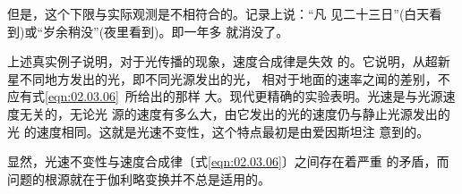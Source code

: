 但是，这个下限与实际观测是不相符合的。记录上说：“凡
见二十三日”(白天看到)或“岁余稍没”(夜里看到)。即一年多
就消没了。

上述真实例子说明，对于光传播的现象，速度合成律是失效
的。它说明，从超新星不同地方发出的光，即不同光源发出的光，
相对于地面的速率之闻的差别，不应有式\eqref{eqn:02.03.06}~所给出的那样
大。现代更精确的实验表明。光速是与光源速度无关的，无论光
源的速度有多么大，由它发出的光的速度仍与静止光源发出的光
的速度相同。这就是光速不变性，这个特点最初是由爱因斯坦注
意到的。

显然，光速不变性与速度合成律〔式\eqref{eqn:02.03.06}〕之间存在着严重
的矛盾，而问题的根源就在于伽利略变换并不总是适用的。